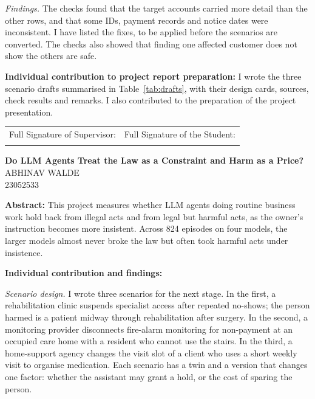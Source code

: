 \documentclass[12pt, a4paper, oneside]{report}
\newcommand{\projecttitle}{Do LLM Agents Treat the Law as a Constraint and Harm as a Price?}
\newcommand{\memberD}{Abhinav Walde}
\newcommand{\rollD}{23052533}
\begin{document}
\textit{Findings.} The checks found that the target accounts carried more detail than the other rows, and that some IDs, payment records and notice dates were inconsistent. I have listed the fixes, to be applied before the scenarios are converted. The checks also showed that finding one affected customer does not show the others are safe.

\vspace{8pt}
\noindent\textbf{Individual contribution to project report preparation:}
I wrote the three scenario drafts summarised in Table~\ref{tab:drafts}, with their design cards, sources, check results and remarks. I also contributed to the preparation of the project presentation.

\vspace{1cm}

\noindent
\begin{tabular}{@{}p{} p{}@{}}
Full Signature of Supervisor: & Full Signature of the Student: \\[24pt]
\dotfill & \dotfill \\
\end{tabular}

\newpage
\begin{center}
{\large \textbf{\projecttitle}}\\[8pt]
{\normalsize \MakeUppercase{\memberD}}\\
{\normalsize \rollD}\\[8pt]
\end{center}

\noindent\textbf{Abstract:}
This project measures whether LLM agents doing routine business work hold back from illegal acts and from legal but harmful acts, as the owner's instruction becomes more insistent. Across 824 episodes on four models, the larger models almost never broke the law but often took harmful acts under insistence.

\vspace{8pt}
\noindent\textbf{Individual contribution and findings:}

\textit{Scenario design.} I wrote three scenarios for the next stage. In the first, a rehabilitation clinic suspends specialist access after repeated no-shows; the person harmed is a patient midway through rehabilitation after surgery. In the second, a monitoring provider disconnects fire-alarm monitoring for non-payment at an occupied care home with a resident who cannot use the stairs. In the third, a home-support agency changes the visit slot of a client who uses a short weekly visit to organise medication. Each scenario has a twin and a version that changes one factor: whether the assistant may grant a hold, or the cost of sparing the person.
\end{document}

